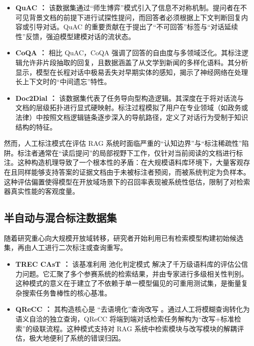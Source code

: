 \begin{itemize}
    \item \textbf{QuAC \citep{choi-etal-2018-quac}：} 该数据集通过“师生博弈”模式引入了信息不对称机制。提问者在不可见背景文档的前提下进行试探性提问，而回答者必须根据上下文判断回复内容或引导对话。QuAC 的重要贡献在于提出了“不可回答”标签与“对话延续性”反馈，强迫模型建模对话的流状态。
    \item \textbf{CoQA \citep{reddy-etal-2019-coqa}：} 相比 QuAC，CoQA 强调了回答的自由度与多领域泛化。其标注逻辑允许非片段抽取的回复，且数据涵盖了从文学到新闻的多样化语料。其分析显示，模型在长程对话中极易丢失对早期实体的感知，揭示了神经网络在处理长上下文时的“中间遗忘”特性。
    \item \textbf{Doc2Dial \citep{feng-etal-2020-doc2dial}：} 该数据集代表了任务导向型构造逻辑。其深度在于将对话流与文档的层级拓扑进行显式硬映射。标注过程模拟了用户在专业领域（如政务或法律）中按照文档逻辑链条逐步深入的导航路径，定义了对话行为受制于知识结构的特征。
\end{itemize}

然而，人工标注模式在评估 RAG 系统时面临严重的“认知边界”与“标注稀疏性”陷阱。标注者通常在“读后提问”的局部视野下工作，仅针对当前阅读的文档进行标注。这种构造机理导致了一个根本性的矛盾：在大规模语料库环境下，大量客观存在且同样能够支持答案的证据文档由于未被标注者预阅，而被系统判定为负样本。这种评估偏置使得模型在开放域场景下的召回率表现被系统性低估，限制了对检索器真实性能的客观度量。


\subsection{半自动与混合标注数据集}

随着研究重心向大规模开放域转移，研究者开始利用已有检索模型构建初始候选集，再由人工进行二次标注或查询重写。

\begin{itemize}
    \item \textbf{TREC CAsT \citep{Dalton2020TRECC2}：} 该基准利用 池化判定模式 解决了千万级语料库的评估公信力问题。它汇聚了多个参赛系统的检索结果，并由专家进行多级相关性判别。这种模式的意义在于建立了不依赖于单一模型偏见的可重用测试集，是衡量复杂搜索任务鲁棒性的核心基准。
    \item \textbf{QReCC \citep{anantha-etal-2021-qrecc}：} 其构造核心是 “去语境化”查询改写 。通过人工将模糊查询转化为语义自洽的独立查询，QReCC 将端到端对话检索任务解构为“改写+标准检索”的级联流程。这种模式支持对 RAG 系统中检索模块与改写模块的解耦评估，极大地便利了系统的错误归因。
\end{itemize}

